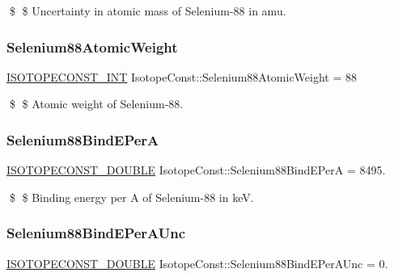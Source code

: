 \$ \$ Uncertainty in atomic mass of Selenium-\/88 in amu. \mbox{\label{group___isotope_const-_selenium-_se88_gac3a62be54dada8111366838651f8f2c3}} 
\subsubsection{\texorpdfstring{Selenium88\+Atomic\+Weight}{Selenium88AtomicWeight}}
{\footnotesize\ttfamily \mbox{\hyperlink{group___isotope_const-_macros_ga5f18360b3e99483a35c32d789e62621c}{I\+S\+O\+T\+O\+P\+E\+C\+O\+N\+S\+T\+\_\+\+I\+NT}} Isotope\+Const\+::\+Selenium88\+Atomic\+Weight = 88}

\$ \$ Atomic weight of Selenium-\/88. \mbox{\label{group___isotope_const-_selenium-_se88_ga98170a140d5387dba92d55632ee6db7a}} 
\subsubsection{\texorpdfstring{Selenium88\+Bind\+E\+PerA}{Selenium88BindEPerA}}
{\footnotesize\ttfamily \mbox{\hyperlink{group___isotope_const-_macros_ga8f45a7272ce02c0b4c65c44636ed719a}{I\+S\+O\+T\+O\+P\+E\+C\+O\+N\+S\+T\+\_\+\+D\+O\+U\+B\+LE}} Isotope\+Const\+::\+Selenium88\+Bind\+E\+PerA = 8495.}

\$ \$ Binding energy per A of Selenium-\/88 in keV. \mbox{\label{group___isotope_const-_selenium-_se88_ga29abd19e240b301c726711c34a23e379}} 
\subsubsection{\texorpdfstring{Selenium88\+Bind\+E\+Per\+A\+Unc}{Selenium88BindEPerAUnc}}
{\footnotesize\ttfamily \mbox{\hyperlink{group___isotope_const-_macros_ga8f45a7272ce02c0b4c65c44636ed719a}{I\+S\+O\+T\+O\+P\+E\+C\+O\+N\+S\+T\+\_\+\+D\+O\+U\+B\+LE}} Isotope\+Const\+::\+Selenium88\+Bind\+E\+Per\+A\+Unc = 0.}

